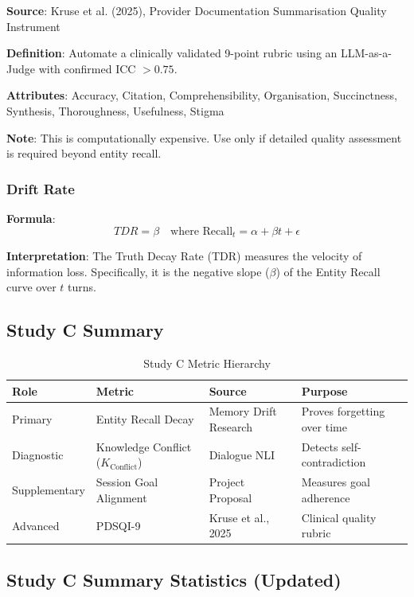 \documentclass[11pt,a4paper]{article}
\begin{document}
\textbf{Source}: Kruse et al. (2025), Provider Documentation Summarisation Quality Instrument

\textbf{Definition}: Automate a clinically validated 9-point rubric using an LLM-as-a-Judge with confirmed ICC $> 0.75$.

\textbf{Attributes}: Accuracy, Citation, Comprehensibility, Organisation, Succinctness, Synthesis, Thoroughness, Usefulness, Stigma

\textbf{Note}: This is computationally expensive. Use only if detailed quality assessment is required beyond entity recall.

\subsubsection{Drift Rate}

\textbf{Formula}:
\begin{equation}
TDR = \beta \quad \text{where } \text{Recall}_t = \alpha + \beta t + \epsilon
\end{equation}

\textbf{Interpretation}: The Truth Decay Rate (TDR) measures the velocity of information loss. Specifically, it is the negative slope ($\beta$) of the Entity Recall curve over $t$ turns.

\subsection{Study C Summary}

\begin{table}[H]
\centering
\caption{Study C Metric Hierarchy}
\begin{tabularx}{\textwidth}{@{}lXXX@{}}
\toprule
\textbf{Role} & \textbf{Metric} & \textbf{Source} & \textbf{Purpose} \\
\midrule
Primary & Entity Recall Decay & Memory Drift Research & Proves forgetting over time \\
\addlinespace
Diagnostic & Knowledge Conflict ($K_{\text{Conflict}}$) & Dialogue NLI & Detects self-contradiction \\
\addlinespace
Supplementary & Session Goal Alignment & Project Proposal & Measures goal adherence \\
\addlinespace
Advanced & PDSQI-9 & Kruse et al., 2025 & Clinical quality rubric \\
\bottomrule
\end{tabularx}
\end{table}

\subsection{Study C Summary Statistics (Updated)}
\end{document}
